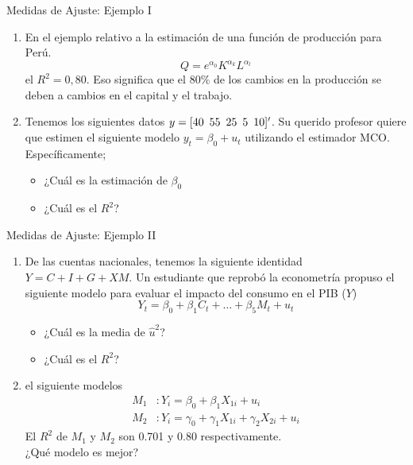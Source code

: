 \begin{frame}{Medidas de Ajuste: Ejemplo I}
	\begin{enumerate}
		\item En el ejemplo relativo a la estimación de una función de producción para Perú.
			$$Q=e^{\alpha_{0}}K^{\alpha_{k}}L^{\alpha_{l}}$$
		el $R ^ 2 = 0,80$. Eso significa que el 80\% de los cambios en la producción se deben a cambios en el capital y el trabajo.
		\item Tenemos los siguientes datos $y = [40\enskip 55\enskip 25\enskip 5\enskip 10]'$. Su querido profesor quiere que estimen el siguiente modelo $y_t = \beta_0+ u_t$ utilizando el estimador MCO. Específicamente;
			\begin{itemize}
				\item ¿Cuál es la estimación de $ \beta_0$
				\item ¿Cuál es el $R^2$?
			\end{itemize}
	\end{enumerate}
\end{frame}
\begin{frame}{Medidas de Ajuste: Ejemplo II}
	\begin{enumerate}
		\item De las cuentas nacionales, tenemos la siguiente identidad $Y = C + I + G + XM$. Un estudiante que reprobó la econometría propuso el siguiente modelo para evaluar el impacto del consumo en el PIB ($Y$)
			$$Y_t = \beta_0+\beta_1C_t+\ldots +\beta_5M_t+u_t$$
			\begin{itemize}
				\item ¿Cuál es la media de $\widehat{u}^2$?
				\item ¿Cuál es el $R^2$?
			\end{itemize}
		\item el siguiente modelos
			\begin{align*}
				M_1 & : Y_i = \beta_0 + \beta_1X_{1i} + u_i\\
				M_2 & : Y_i = \gamma_0 + \gamma_1X_{1i} + \gamma_2X_{2i} + u_i
			\end{align*}
			El $R^2$ de $M_1$ y $M_2$ son 0.701 y 0.80 respectivamente.\\
			¿Qué modelo es mejor?
	\end{enumerate}
\end{frame}
